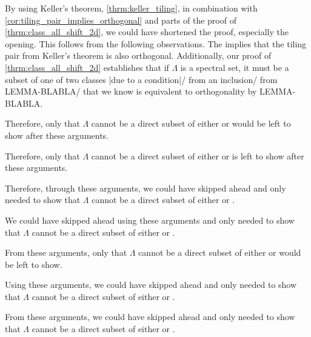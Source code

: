 \documentclass[../thesis.tex]{subfiles}
\begin{document}
\begin{remark}
    By using Keller's theorem, \cref{thrm:keller_tiling}, in combination with \cref{cor:tiling_pair_implies_orthogonal} and parts of the proof of \cref{thrm:class_all_shift_2d}, we could have shortened the proof, especially the opening. This follows from the following observations. The  implies that the tiling pair from Keller's theorem is also orthogonal. Additionally, our proof of \cref{thrm:class_all_shift_2d} establishes that if $\Lambda$ is a spectral set, it must be a subset of one of two classes |due to a condition|/ from an inclusion/ from LEMMA-BLABLA/  that we know is equivalent to orthogonality by LEMMA-BLABLA. 
    

    Therefore, only that $\Lambda$ cannot be a direct subset of either  or  would be left to show after these arguments. 

    Therefore, only that $\Lambda$ cannot be a direct subset of either  or  is left to show after these arguments. 

    Therefore, through these arguments, we could have skipped ahead and only needed to show that $\Lambda$ cannot be a direct subset of either  or .

    We could have skipped ahead using these arguments and only needed to show that $\Lambda$ cannot be a direct subset of either  or .

    From these arguments, only that $\Lambda$ cannot be a direct subset of either  or  would be left to show.

    Using these arguments, we could have skipped ahead and only needed to show that $\Lambda$ cannot be a direct subset of either  or .
    

    From these arguments, we could have skipped ahead and only needed to show that $\Lambda$ cannot be a direct subset of either  or .





\end{remark}
\end{document}
